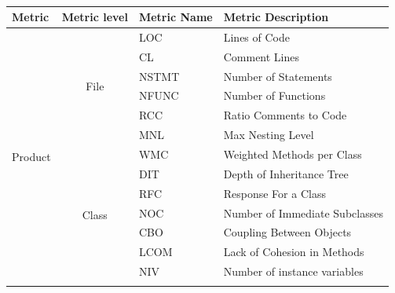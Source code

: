 \documentclass[10pt,journal,compsoc]{IEEEtran}
\begin{document}
 
\begin{table}[!t]
 
~\\

\scriptsize
\begin{tabular}{|p{1cm}|c|l|p{3cm}|}
\hline
\multicolumn{1}{|l|}{\textbf{Metric}}        & \multicolumn{1}{l|}{\textbf{Metric level}} & \textbf{Metric Name} &\textbf{ Metric Description}             \\ \hline
\multirow{21}{*}{Product   } & \multirow{6}{*}{File}             & LOC         & Lines of Code                  \\ \cline{3-4} 
                                  &                                   & CL          & Comment Lines                  \\ \cline{3-4} 
                                  &                                   & NSTMT       & Number of Statements           \\ \cline{3-4} 
                                  &                                   & NFUNC       & Number of Functions            \\ \cline{3-4} 
                                  &                                   & RCC         & Ratio Comments to Code         \\ \cline{3-4} 
                                  &                                   & MNL         & Max Nesting Level              \\ \cline{2-4} 
                                  & \multirow{12}{*}{Class}           & WMC         & Weighted Methods per Class     \\ \cline{3-4} 
                                  &                                   & DIT         & Depth of Inheritance Tree      \\ \cline{3-4} 
                                  &                                   & RFC         & Response For a Class           \\ \cline{3-4} 
                                  &                                   & NOC         & Number of Immediate Subclasses \\ \cline{3-4} 
                                  &                                   & CBO         & Coupling Between Objects       \\ \cline{3-4} 
                                  &                                   & LCOM        & Lack of Cohesion in Methods    \\ \cline{3-4} 
                                  &                                   & NIV         & Number of instance variables   \\ \cline{3-4} 

\end{tabular}
\end{table}
\end{document}
